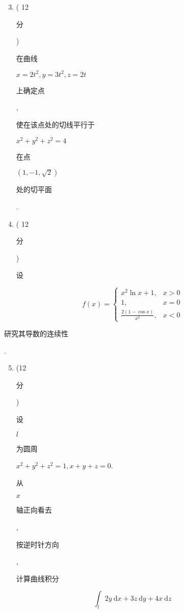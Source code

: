 \documentclass[10pt]{article}
\begin{document}
\begin{enumerate}
  \setcounter{enumi}{2}
  \item ( 12 \begin{CJK}{UTF8}{mj}分\end{CJK}) \begin{CJK}{UTF8}{mj}在曲线\end{CJK} $x=2 t^{2}, y=3 t^{2}, z=2 t$ \begin{CJK}{UTF8}{mj}上确定点\end{CJK}, \begin{CJK}{UTF8}{mj}使在该点处的切线平行于\end{CJK} $x^{2}+y^{2}+z^{2}=4$ \begin{CJK}{UTF8}{mj}在点\end{CJK} $(1,-1, \sqrt{2})$ \begin{CJK}{UTF8}{mj}处的切平面\end{CJK}.

  \item ( 12 \begin{CJK}{UTF8}{mj}分\end{CJK}) \begin{CJK}{UTF8}{mj}设\end{CJK}

\end{enumerate}
$$
f(x)=\left\{\begin{array}{cl}
x^{2} \ln x+1, & x>0 \\
1, & x=0 \\
\frac{2(1-\cos x)}{x^{2}}, & x<0
\end{array}\right.
$$
\begin{CJK}{UTF8}{mj}研究其导数的连续性\end{CJK}.

\begin{enumerate}
  \setcounter{enumi}{4}
  \item (12 \begin{CJK}{UTF8}{mj}分\end{CJK}) \begin{CJK}{UTF8}{mj}设\end{CJK} $l$ \begin{CJK}{UTF8}{mj}为圆周\end{CJK} $x^{2}+y^{2}+z^{2}=1, x+y+z=0$. \begin{CJK}{UTF8}{mj}从\end{CJK} $x$ \begin{CJK}{UTF8}{mj}轴正向看去\end{CJK}, \begin{CJK}{UTF8}{mj}按逆时针方向\end{CJK}, \begin{CJK}{UTF8}{mj}计算曲线积分\end{CJK}
\end{enumerate}
$$
\int_{l} 2 y \mathrm{~d} x+3 z \mathrm{~d} y+4 x \mathrm{~d} z
$$
\end{document}
